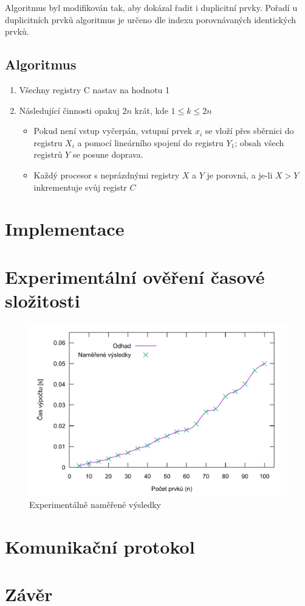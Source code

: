 \documentclass[11pt,a4paper]{article}
\begin{document}
Algoritmus byl modifikován tak, aby dokázal řadit i duplicitní prvky. Pořadí u duplicitních prvků algoritmus je určeno dle indexu porovnávaných identických prvků.

\subsection{Algoritmus}
\begin{enumerate}
    \item {Všechny registry C nastav na hodnotu 1}
    \item {Následující činnosti opakuj $2n$ krát, kde $1 \leq k \leq 2n$}
        \begin{itemize}
            \item{Pokud není vstup vyčerpán, vstupní prvek $x_i$ se vloží přes sběrnici do registru $X_i$ a pomocí lineárního spojení do registru $Y_1$; obsah všech registrů $Y$ se posune doprava.}
            \item{Každý procesor s neprázdnými registry $X$ a $Y$ je porovná, a je-li $X > Y$ inkrementuje svůj registr $C$}
        \end{itemize}
\end{enumerate}

\section{Implementace}

\section{Experimentální ověření časové složitosti}

\begin{figure}[!ht]
    \centering
    \includegraphics[width=1\textwidth]{results}
    \caption{Experimentálně naměřené výsledky}
\end{figure}

\section{Komunikační protokol}


\section{Závěr}




\makeatletter
\makeatother

\end{document}
